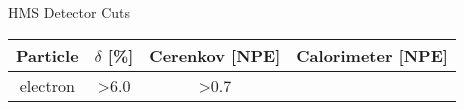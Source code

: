 \begin{Mtable}{HMS Detector Cuts}
  \centering
  \begin{tabular}{|c|c|c|c|}
    \hline
    \textbf{Particle} & \textbf{$\delta$ [\%]} & \textbf{Cerenkov [NPE]} & \textbf{Calorimeter [NPE]} \\
    \hline    
    electron & >6.0 &  >0.7 \\
    \hline
  \end{tabular}
  \caption{}
  \label{tab:3-3_hms_det_cuts}
\end{Mtable}

